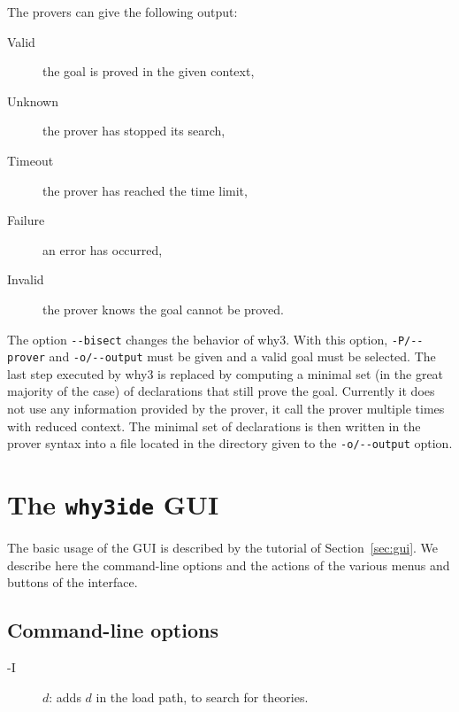 
\noindent
The provers can give the following output:
\begin{description}
\item[Valid] the goal is proved in the given context,
\item[Unknown] the prover has stopped its search,
\item[Timeout] the prover has reached the time limit,
\item[Failure] an error has occurred,
\item[Invalid] the prover knows the goal cannot be proved.
\end{description}

The option \verb|--bisect| changes the behavior of why3. With this
option, \verb|-P/--prover| and \verb|-o/--output| must be given
and a valid goal must be selected. The last step executed by why3 is
replaced by computing a minimal set (in the great majority of the
case) of declarations that still prove the goal. Currently it does not
use any information provided by the prover, it call the prover
multiple times with reduced context. The minimal set of declarations is
then written in the prover syntax into a file located in the directory
given to the \verb|-o/--output| option.

\section{The \texttt{why3ide} GUI}
\label{sec:ideref}

The basic usage of the GUI is described by the tutorial of
Section~\ref{sec:gui}. We describe here the command-line options and
the actions of the various menus and buttons of the interface.

\subsection{Command-line options}

\begin{description}
\item[-I] $d$: adds $d$ in the load path, to search for theories.
\end{description}

